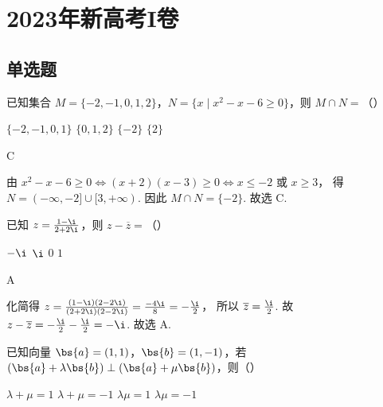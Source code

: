 
\chapter{2023年新高考I卷}

\section{单选题}

\begin{problem}
已知集合 \(M=\{-2,-1,0,1,2\}\)，\(N=\{x\mid x^2-x-6\ge 0\}\)，则 \(M\cap N=\)（\quad）

\choices
    {\(\{-2,-1,0,1\}\)}
    {\(\{0,1,2\}\)}
    {\(\{-2\}\)}
    {\(\{2\}\)}
\end{problem}

\begin{answer}
C
\end{answer}

\begin{solution}
由
\(x^2-x-6\ge 0 \iff (x+2)(x-3)\ge 0 \iff x\le -2 \text{\ 或\ } x\ge 3\)，
得 \(N=(-\infty,-2]\cup[3,+\infty)\). 因此
\(M\cap N=\{-2\}\).
故选 C.
\end{solution}

\begin{problem}
已知 \(z=\frac{1-\i}{2+2\i}\)，则 \(z-\overline z=\)（\quad）

\choices
    {\(-\i\)}
    {\(\i\)}
    {\(0\)}
    {\(1\)}
\end{problem}

\begin{answer}
A
\end{answer}

\begin{solution}
化简得
\(z=\frac{(1-\i)(2-2\i)}{(2+2\i)(2-2\i)} =\frac{-4\i}{8} =-\frac{\i}{2}\)，
所以 \(\overline z=\frac{\i}{2}\). 故
\(z-\overline z=-\frac{\i}{2}-\frac{\i}{2}=-\i\).
故选 A.
\end{solution}

\begin{problem}
已知向量 \(\bs{a}=(1,1)\)，\(\bs{b}=(1,-1)\)，若 \((\bs{a}+\lambda\bs{b})\perp(\bs{a}+\mu\bs{b})\)，则（\quad）

\choices
    {\(\lambda+\mu=1\)}
    {\(\lambda+\mu=-1\)}
    {\(\lambda\mu=1\)}
    {\(\lambda\mu=-1\)}
\end{problem}

